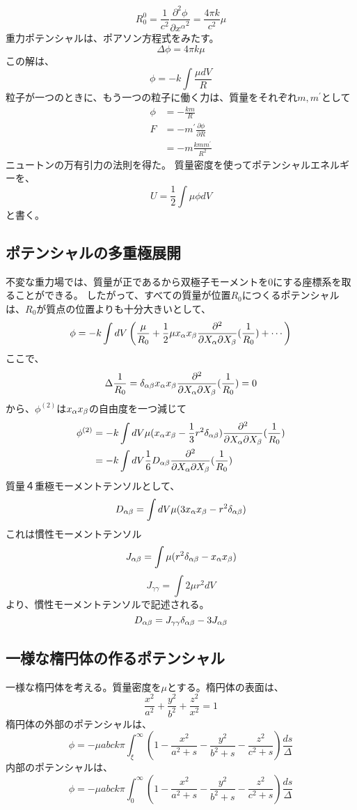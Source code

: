 \documentclass{jsarticle}
\newcommand{\pder}[2][]{\frac{\partial#1}{\partial#2}}
\newcommand{\ppder}[2][]{\frac{\partial^2#1}{{\partial#2}^2}}
\newcommand{\pikder}[3][]{\frac{\partial^2#1}{{\partial#2 \partial#3}}}
\newcommand{\half}{\frac{1}{2}}
\newcommand{\ddfrac}[2]{\frac{{#1}^2}{{#2}^2}}
\newcommand{\beq}{\begin{equation}}
\newcommand{\eeq}{\end{equation}}
\begin{document}
\beq
R^0_0 = \frac{1}{c^2} \ppder[\phi]{{x^\alpha}} = \frac{4\pi k}{c^2} \mu
\eeq
重力ポテンシャルは、ポアソン方程式をみたす。
\beq
    \Delta  \phi = 4 \pi k \mu
\eeq
この解は、
\beq
    \phi = -k \int \frac{\mu dV}{R}
\eeq
粒子が一つのときに、もう一つの粒子に働く力は、質量をそれぞれ$m,m^\prime$として
\begin{align}
    \phi &= - \frac{km}{R}\\
    F &= - m^\prime \pder[\phi]{R}\\
      &= -m \frac{kmm^\prime}{R^2}
\end{align}
ニュートンの万有引力の法則を得た。
質量密度を使ってポテンシャルエネルギーを、
\beq
U = \half \int \mu \phi dV
\eeq
と書く。
\subsection{ポテンシャルの多重極展開}
不変な重力場では、質量が正であるから双極子モーメントを$0$にする座標系を取ることができる。
したがって、すべての質量が位置$R_0$につくるポテンシャルは、$R_0$が質点の位置よりも十分大きいとして、
\beq
\phi = -k \int dV \left(\frac{\mu}{R_0} + \half \mu x_\al x_\be \pikder[]{X_\al}{X_\be}(\frac{1}{R_0}) + \cdots \right)
\eeq
ここで、
\beq
    \Delta \frac{1}{R_0} = \delta_{\al \be} x_\al x_\be \pikder[]{X_\al}{X_\be}(\frac{1}{R_0}) = 0
\eeq
から、$\phi^{(2)}$は$x_\alpha x_\beta$の自由度を一つ減じて
\begin{align}
    \phi^{(2)} &= -k \int dV \mu (x_\al x_\be - \frac{1}{3}r^2 \delta_{\al \be})\pikder[]{X_\al}{X_\be}(\frac{1}{R_0})\\
               &= -k \int dV \frac{1}{6} D_{\al \be} \pikder[]{X_\al}{X_\be}(\frac{1}{R_0})
\end{align}
質量４重極モーメントテンソルとして、
\beq
D_{\al \be} = \int dV \mu(3x_\al x_\be - r^2 \delta_{\al \be})
\eeq
これは慣性モーメントテンソル
\beq
    J_{\al \be} = \int \mu (r^2 \delta_{\al \be} - x_\al x_\be)
\eeq
\beq
J_{\gamma \gamma} = \int 2 \mu r^2 dV 
\eeq
より、慣性モーメントテンソルで記述される。
\beq
D_{\al \be} = J_{\gamma \gamma}\delta_{\al \be} - 3 J_{\al \be}
\eeq
\subsection{一様な楕円体の作るポテンシャル}
一様な楕円体を考える。質量密度を$\mu$とする。楕円体の表面は、
\beq
\ddfrac{x}{a} + \ddfrac{y}{b} + \ddfrac{z}{x} = 1
\eeq
楕円体の外部のポテンシャルは、
\beq
\phi = -\mu abck \pi \int_{\xi}^{\infty} \left(1 - \frac{x^2}{a^2+ s} - \frac{y^2}{b^2+ s}- \frac{z^2}{c^2+ s}\right)\frac{ds}{\Delta}
\eeq
内部のポテンシャルは、
\beq
\phi = -\mu abck \pi \int_{0}^{\infty} \left(1 - \frac{x^2}{a^2+ s} - \frac{y^2}{b^2+ s}- \frac{z^2}{c^2+ s}\right)\frac{ds}{\Delta}
\eeq
\end{document}
